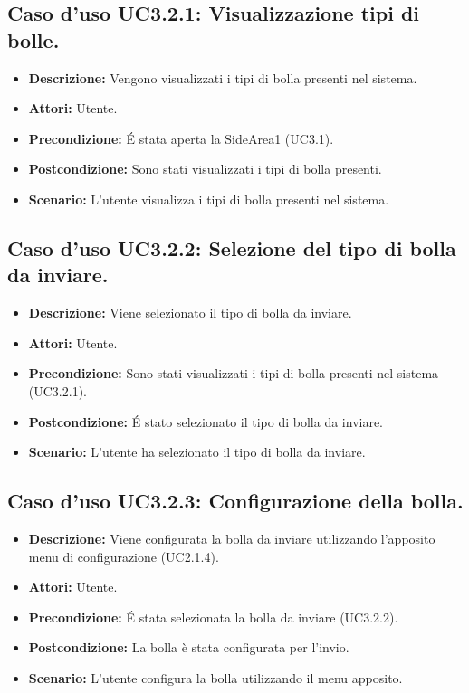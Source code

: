 \subsection{Caso d'uso UC3.2.1: Visualizzazione tipi di bolle.}
\begin{itemize}
\item[]\textbf{Descrizione:} Vengono visualizzati i tipi di bolla presenti nel sistema.
\item[]\textbf{Attori:} Utente. 
\item[]\textbf{Precondizione:} \'E stata aperta la SideArea1 (UC3.1). 
\item[]\textbf{Postcondizione:} Sono stati visualizzati i tipi di bolla presenti. 
\item[]\textbf{Scenario:}
L'utente visualizza i tipi di bolla presenti nel sistema. 
\end{itemize}

\subsection{Caso d'uso UC3.2.2: Selezione del tipo di bolla da inviare.}
\begin{itemize}
\item[]\textbf{Descrizione:} Viene selezionato il tipo di bolla da inviare.
\item[]\textbf{Attori:} Utente. 
\item[]\textbf{Precondizione:} Sono stati visualizzati i tipi di bolla presenti nel sistema (UC3.2.1). 
\item[]\textbf{Postcondizione:} \'E stato selezionato il tipo di bolla da inviare. 
\item[]\textbf{Scenario:}
L'utente ha selezionato il tipo di bolla da inviare. 
\end{itemize}

\subsection{Caso d'uso UC3.2.3: Configurazione della bolla.}
\begin{itemize}
\item[]\textbf{Descrizione:} Viene configurata la bolla da inviare utilizzando l'apposito menu di configurazione (UC2.1.4).
\item[]\textbf{Attori:} Utente. 
\item[]\textbf{Precondizione:} \'E stata selezionata la bolla da inviare (UC3.2.2). 
\item[]\textbf{Postcondizione:} La bolla è stata configurata per l'invio. 
\item[]\textbf{Scenario:}
L'utente configura la bolla utilizzando il menu apposito. 
\end{itemize}

